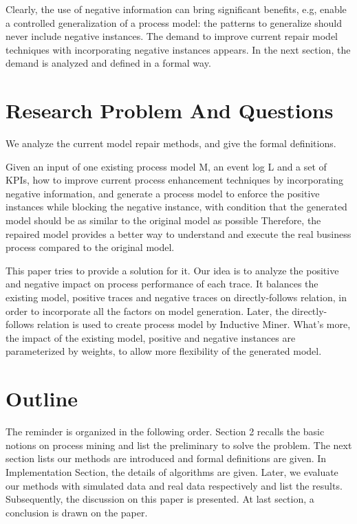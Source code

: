 Clearly, the use of negative information can bring significant benefits, e.g, enable a controlled generalization of a process model: the patterns to generalize should never include negative instances. The demand to improve current repair model techniques with incorporating negative instances appears. In the next section, the demand is analyzed and defined in a formal way.

\section{Research Problem And Questions}
We analyze the current model repair methods, and give the formal definitions.
\begin{definition}
Given an input of one existing process model M, an event log L and a set of KPIs, how  to improve current process enhancement techniques by incorporating negative information, and generate a process model to enforce the positive instances while blocking the negative instance, with condition that the generated model should be as similar to the original model as possible Therefore, the repaired model provides a better way to understand and execute the real business process compared to the original model.
\end{definition}


This paper tries to provide a solution for it. Our idea is to analyze the positive and negative impact on process performance of each trace. It balances the existing model, positive traces and negative traces on directly-follows relation, in order to incorporate all the factors on model generation. Later, the directly-follows relation is used to create process model by Inductive Miner. What's more, the impact of the existing model, positive and negative instances are parameterized by weights, to allow more flexibility of the generated model.

\section{Outline}
The reminder is organized in the following order. Section 2 recalls the basic notions on process mining and list the preliminary to solve the problem. The next section lists our methods are introduced and formal definitions are given. In Implementation Section, the details of algorithms are given. Later, we evaluate our methods with simulated data and real data respectively and list the results. Subsequently, the discussion on this paper is presented. At last section, a conclusion is drawn on the paper. 


%